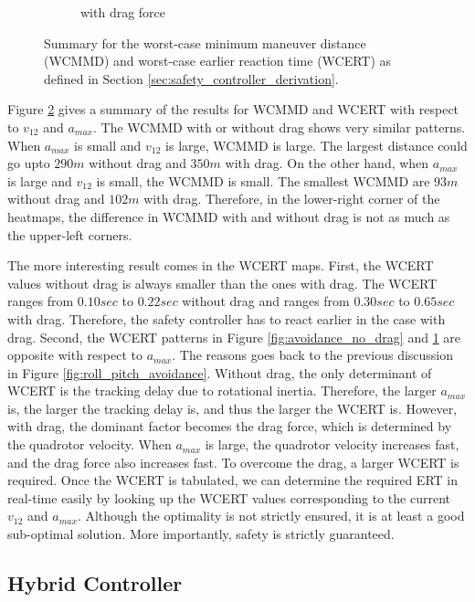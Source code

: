 \documentclass[journal,11pt,onecolumn,draftclsnofoot,]{IEEEtran}
\begin{document}
\begin{figure}
\begin{subfigure}[b]{.45\columnwidth}
        \caption{with drag force}
        \label{fig:avoidance_drag}
    \end{subfigure}
    \caption{Summary for the
    worst-case minimum maneuver distance (WCMMD) and worst-case earlier reaction time (WCERT) as defined in Section \ref{sec:safety_controller_derivation}.}
    \label{fig:WCMMD_WCERT}
\end{figure}

Figure \ref{fig:WCMMD_WCERT} gives a summary of the results for WCMMD and WCERT with respect to $v_{12}$ and $a_{max}$. The WCMMD with or without drag shows very similar patterns. When $a_{max}$ is small and $v_{12}$ is large, WCMMD is large. The largest distance could go upto $290m$ without drag and $350m$ with drag. On the other hand, when $a_{max}$ is large and $v_{12}$ is small, the WCMMD is small. The smallest WCMMD are $93m$ without drag and $102m$ with drag. Therefore, in the lower-right corner of the heatmaps, the difference in WCMMD with and without drag is not as much as the upper-left corners. 

The more interesting result comes in the WCERT maps. First, the WCERT values without drag is always smaller than the ones with drag. The WCERT ranges from $0.10sec$ to $0.22sec$ without drag and ranges from $0.30sec$ to $0.65sec$ with drag. Therefore, the safety controller has to react earlier in the case with drag. Second, the WCERT patterns in Figure \ref{fig:avoidance_no_drag} and \ref{fig:avoidance_drag} are opposite with respect to $a_{max}$. The reasons goes back to the previous discussion in Figure \ref{fig:roll_pitch_avoidance}. Without drag, the only determinant of WCERT is the tracking delay due to rotational inertia. Therefore, the larger $a_{max}$ is, the larger the tracking delay is, and thus the larger the WCERT is. However, with drag, the dominant factor becomes the drag force, which is determined by the quadrotor velocity. When $a_{max}$ is large, the quadrotor velocity increases fast, and the drag force also increases fast. To overcome the drag, a larger WCERT is required. Once the WCERT is tabulated, we can determine the required ERT in real-time easily by looking up the WCERT values corresponding to the current $v_{12}$ and $a_{max}$. Although the optimality is not strictly ensured, it is at least a good sub-optimal solution. More importantly, safety is strictly guaranteed.

\subsection{Hybrid Controller}
\end{document}
